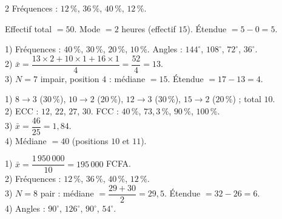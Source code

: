\begin{multicols}{2}
Fréquences : $12\,\%$, $36\,\%$, $40\,\%$, $12\,\%$.

Effectif total $=50$. Mode $=2$ heures (effectif $15$). Étendue $=5-0=5$.

1) Fréquences : $40\,\%$, $30\,\%$, $20\,\%$, $10\,\%$. Angles : $144^{\circ}$, $108^{\circ}$,
$72^{\circ}$, $36^{\circ}$.\\
2) $\bar{x}=\dfrac{13\times2+10\times1+16\times1}{4}=\dfrac{52}{4}=13$.\\
3) $N=7$ impair, position $4$ : médiane $=15$. Étendue $=17-13=4$.

1) $8\to3$ ($30\,\%$), $10\to2$ ($20\,\%$), $12\to3$ ($30\,\%$), $15\to2$ ($20\,\%$) ;
total $10$.\\
2) ECC : $12$, $22$, $27$, $30$. FCC : $40\,\%$, $73{,}3\,\%$, $90\,\%$, $100\,\%$.\\
3) $\bar{x}=\dfrac{46}{25}=1{,}84$.\\
4) Médiane $=40$ (positions $10$ et $11$).

1) $\bar{x}=\dfrac{1\,950\,000}{10}=195\,000$ FCFA.\\
2) Fréquences : $12\,\%$, $36\,\%$, $40\,\%$, $12\,\%$.\\
3) $N=8$ pair : médiane $=\dfrac{29+30}{2}=29{,}5$. Étendue $=32-26=6$.\\
4) Angles : $90^{\circ}$, $126^{\circ}$, $90^{\circ}$, $54^{\circ}$.

\end{multicols}
\exercicesBanner

